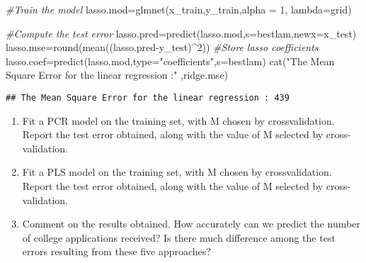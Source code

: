 \documentclass[
]{article}
\newenvironment{Shaded}{\begin{snugshade}}{\end{snugshade}}
\newcommand{\AttributeTok}[1]{\textcolor[rgb]{0.77,0.63,0.00}{#1}}
\newcommand{\CommentTok}[1]{\textcolor[rgb]{0.56,0.35,0.01}{\textit{#1}}}
\newcommand{\DecValTok}[1]{\textcolor[rgb]{0.00,0.00,0.81}{#1}}
\newcommand{\FunctionTok}[1]{\textcolor[rgb]{0.00,0.00,0.00}{#1}}
\newcommand{\NormalTok}[1]{#1}
\newcommand{\OtherTok}[1]{\textcolor[rgb]{0.56,0.35,0.01}{#1}}
\newcommand{\SpecialCharTok}[1]{\textcolor[rgb]{0.00,0.00,0.00}{#1}}
\newcommand{\StringTok}[1]{\textcolor[rgb]{0.31,0.60,0.02}{#1}}
\providecommand{\tightlist}{%
  \setlength{\itemsep}{0pt}\setlength{\parskip}{0pt}}
\begin{document}
\begin{Shaded}
\begin{Highlighting}[]
\CommentTok{\#Train the model}
\NormalTok{lasso.mod}\OtherTok{=}\FunctionTok{glmnet}\NormalTok{(x\_train,y\_train,}\AttributeTok{alpha =} \DecValTok{1}\NormalTok{, }\AttributeTok{lambda=}\NormalTok{grid)}

\CommentTok{\#Compute the test error}
\NormalTok{lasso.pred}\OtherTok{=}\FunctionTok{predict}\NormalTok{(lasso.mod,}\AttributeTok{s=}\NormalTok{bestlam,}\AttributeTok{newx=}\NormalTok{x\_test)}
\NormalTok{lasso.mse}\OtherTok{=}\FunctionTok{round}\NormalTok{(}\FunctionTok{mean}\NormalTok{((lasso.pred}\SpecialCharTok{{-}}\NormalTok{y\_test)}\SpecialCharTok{\^{}}\DecValTok{2}\NormalTok{))}
\CommentTok{\#Store lasso coefficients}
\NormalTok{lasso.coef}\OtherTok{=}\FunctionTok{predict}\NormalTok{(lasso.mod,}\AttributeTok{type=}\StringTok{"coefficients"}\NormalTok{,}\AttributeTok{s=}\NormalTok{bestlam)}
\FunctionTok{cat}\NormalTok{(}\StringTok{"The Mean Square Error for the linear regression :"}\NormalTok{ ,ridge.mse)}
\end{Highlighting}
\end{Shaded}

\begin{verbatim}
## The Mean Square Error for the linear regression : 439
\end{verbatim}

\begin{enumerate}
\def\labelenumi{\arabic{enumi}.}
\setcounter{enumi}{4}
\tightlist
\item
  Fit a PCR model on the training set, with M chosen by crossvalidation.
  Report the test error obtained, along with the value of M selected by
  cross-validation.\\
\item
  Fit a PLS model on the training set, with M chosen by crossvalidation.
  Report the test error obtained, along with the value of M selected by
  cross-validation.\\
\item
  Comment on the results obtained. How accurately can we predict the
  number of college applications received? Is there much difference
  among the test errors resulting from these five approaches?
\end{enumerate}
\end{document}
